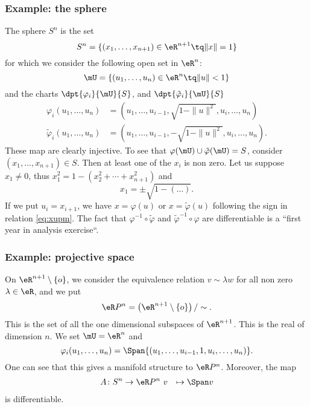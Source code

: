\subsubsection{Example: the sphere}

The sphere $S^n$ is the set
\[
  S^n=\{  (x_1,\ldots, x_{n+1})\in\eR^{n+1}\tq \|x\|=1  \}
\]
for which we consider the following open set in $\eR^n$:
\[
   \mU=\{  (u_1,\ldots,u_n)\in\eR^n\tq\|u\|<1  \}
\]
and the charts $\dpt{\varphi_i}{\mU}{S}$, and $\dpt{\tilde{\varphi}_i}{\mU}{S}$
\begin{subequations}
\begin{align}
   \varphi_i(u_1,\ldots,u_n)&=(u_1,\ldots,u_{i-1}, \sqrt{  1-\|u\|^2  },u_i,\ldots,u_n )\\
   \tilde{\varphi}_i(u_1,\ldots,u_n)&=(u_1,\ldots,u_{i-1}, -\sqrt{  1-\|u\|^2  },u_i,\ldots,u_n ).
\end{align}
\end{subequations}
These map are clearly injective. To see that $\varphi(\mU)\cup\tilde{\varphi}(\mU)=S$, consider $(x_1,\ldots,x_{n+1})\in S$. Then at least one of the $x_i$ is non zero. Let us suppose $x_1\neq 0$, thus $x_1^2=1-(x_2^2+\cdots+x_{n+1}^2)$ and
\begin{equation}\label{eq:xupm}
   x_1=\pm\sqrt{1-(\ldots)}.
\end{equation}
If we put $u_i=x_{i+1}$, we have $x=\varphi(u)$ or $x=\tilde{\varphi}(u)$ following the sign in relation \eqref{eq:xupm}. The fact that $\varphi^{-1}\circ\tilde{\varphi}$ and $\tilde{\varphi}^{-1}\circ\varphi$ are differentiable is a ``first year in analysis exercise``.

\subsubsection{Example: projective space}

On $\eR^{n+1}\setminus\{o\}$, we consider the equivalence relation $v\sim\lambda w$ for all non zero $\lambda\in\eR$, and we put
\[
  \eR P^n=\left(\eR^{n+1}\setminus\{o\}\right)/\sim.
\]
This is the set of all the one dimensional subspaces of $\eR^{n+1}$. This is the real  of dimension $n$. We set $\mU=\eR^n$ and
\[
  \varphi_i(u_1,\ldots,u_n)=\Span\{ (u_1,\ldots,u_{i-1},1,u_i,\ldots,u_n) \}.
\]
One can see that this gives a manifold structure to $\eR P^n$. Moreover, the map
		\begin{equation}
		\begin{aligned}
			A \colon S^n &\to \eR P^n\
			v&\mapsto \Span v
		\end{aligned}
	\end{equation}
is differentiable.

